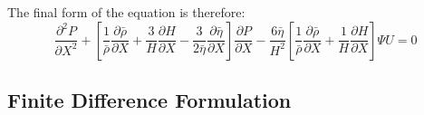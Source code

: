 The final form of the equation is therefore:
\begin{equation}\label{eq3.14}
	\frac{\partial^{2} P}{\partial X^{2}}+\left[\frac{1}{\bar{\rho}} \frac{\partial \bar{\rho}}{\partial X}+\frac{3}{H} \frac{\partial H}{\partial X}-\frac{3}{2 \bar{\eta}} \frac{\partial \bar{\eta}}{\partial X}\right] \frac{\partial P}{\partial X}-\frac{6 \bar{\eta}}{H^{2}}\left[\frac{1}{\bar{\rho}} \frac{\partial \bar{\rho}}{\partial X}+\frac{1}{H} \frac{\partial H}{\partial X}\right] \Psi U=0
\end{equation}

\subsection{Finite Difference Formulation} \label{Finite Difference Formulation}


